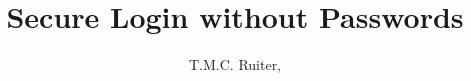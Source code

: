 \documentclass[a4paper,draft]{article}
\title{Secure Login without Passwords}
\author{T.M.C. Ruiter, \XORlogo}
\begin{document}
\raggedbottom
\maketitle
\newcommand{\includesection}[1]{\newpage}
\newcommand{\includesectionnopagebreak}[1]{}
\includesection{abstract}
\newpage
\includesection{introduction}
\includesection{general}
\includesectionnopagebreak{conclusion}


\end{document}
